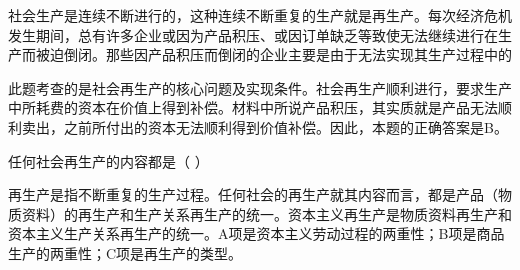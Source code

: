 \question 社会生产是连续不断进行的，这种连续不断重复的生产就是再生产。每次经济危机发生期间，总有许多企业或因为产品积压、或因订单缺乏等致使无法继续进行在生产而被迫倒闭。那些因产品积压而倒闭的企业主要是由于无法实现其生产过程中的
\par{}
\begin{solution}此题考查的是社会再生产的核心问题及实现条件。社会再生产顺利进行，要求生产中所耗费的资本在价值上得到补偿。材料中所说产品积压，其实质就是产品无法顺利卖出，之前所付出的资本无法顺利得到价值补偿。因此，本题的正确答案是B。
\end{solution}
\question 任何社会再生产的内容都是（ ）
\par{}
\begin{solution}再生产是指不断重复的生产过程。任何社会的再生产就其内容而言，都是产品（物质资料）的再生产和生产关系再生产的统一。资本主义再生产是物质资料再生产和资本主义生产关系再生产的统一。A项是资本主义劳动过程的两重性；B项是商品生产的两重性；C项是再生产的类型。
\end{solution}
